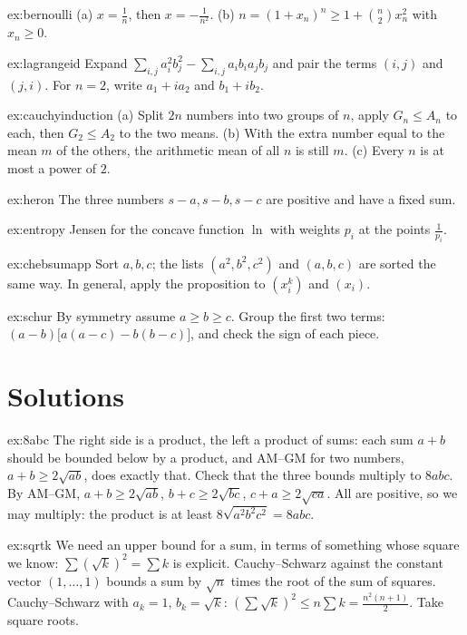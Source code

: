 \begin{hint}{ex:bernoulli}
(a) $x=\frac1n$, then $x=-\frac1{n^2}$. (b) $n=(1+x_n)^n\ge1+\binom n2x_n^2$ with $x_n\ge0$.
\end{hint}
\begin{hint}{ex:lagrangeid}
Expand $\sum_{i,j}a_i^2b_j^2-\sum_{i,j}a_ib_ia_jb_j$ and pair the terms $(i,j)$ and $(j,i)$. For $n=2$, write $a_1+ia_2$ and $b_1+ib_2$.
\end{hint}
\begin{hint}{ex:cauchyinduction}
(a) Split $2n$ numbers into two groups of $n$, apply $G_n\le A_n$ to each, then $G_2\le A_2$ to the two means. (b) With the extra number equal to the mean $m$ of the others, the arithmetic mean of all $n$ is still $m$. (c) Every $n$ is at most a power of $2$.
\end{hint}
\begin{hint}{ex:heron}
The three numbers $s-a,s-b,s-c$ are positive and have a fixed sum.
\end{hint}
\begin{hint}{ex:entropy}
Jensen for the concave function $\ln$ with weights $p_i$ at the points $\frac1{p_i}$.
\end{hint}
\begin{hint}{ex:chebsumapp}
Sort $a,b,c$; the lists $(a^2,b^2,c^2)$ and $(a,b,c)$ are sorted the same way. In general, apply the proposition to $(x_i^k)$ and $(x_i)$.
\end{hint}
\begin{hint}{ex:schur}
By symmetry assume $a\ge b\ge c$. Group the first two terms: $(a-b)\bigl[a(a-c)-b(b-c)\bigr]$, and check the sign of each piece.
\end{hint}

\section{Solutions}

\begin{solution}{ex:8abc}
\idea The right side is a product, the left a product of sums: each sum $a+b$ should be bounded below by a product, and AM--GM for two numbers, $a+b\ge2\sqrt{ab}$, does exactly that. Check that the three bounds multiply to $8abc$.
\writeup By AM--GM, $a+b\ge2\sqrt{ab}$, $b+c\ge2\sqrt{bc}$, $c+a\ge2\sqrt{ca}$. All are positive, so we may multiply: the product is at least $8\sqrt{a^2b^2c^2}=8abc$.
\end{solution}

\begin{solution}{ex:sqrtk}
\idea We need an upper bound for a sum, in terms of something whose square we know: $\sum(\sqrt k)^2=\sum k$ is explicit. Cauchy--Schwarz against the constant vector $(1,\dots,1)$ bounds a sum by $\sqrt n$ times the root of the sum of squares.
\writeup Cauchy--Schwarz with $a_k=1$, $b_k=\sqrt k$: $\left(\sum\sqrt k\right)^2\le n\sum k=\frac{n^2(n+1)}2$. Take square roots.
\end{solution}

